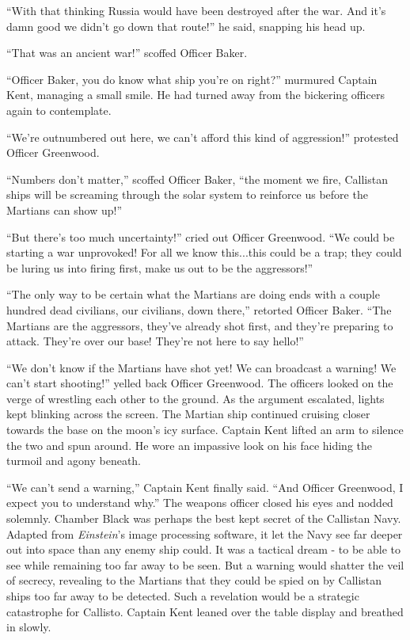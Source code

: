\documentclass[12pt]{article} %
\begin{document}
``With that thinking Russia would have been destroyed after the war. And it's damn good we didn't go down that route!'' he said, snapping his head up.

``That was an ancient war!'' scoffed Officer Baker.

``Officer Baker, you do know what ship you're on right?'' murmured Captain Kent, managing a small smile. He had turned away from the bickering officers again to contemplate.

``We're outnumbered out here, we can't afford this kind of aggression!'' protested Officer Greenwood.

``Numbers don't matter,'' scoffed Officer Baker, ``the moment we fire, Callistan ships will be screaming through the solar system to reinforce us before the Martians can show up!''

``But there's too much uncertainty!'' cried out Officer Greenwood. ``We could be starting a war unprovoked! For all we know this...this could be a trap; they could be luring us into firing first, make us out to be the aggressors!''

``The only way to be certain what the Martians are doing ends with a couple hundred dead civilians, our civilians, down there,'' retorted Officer Baker. ``The Martians are the aggressors, they've already shot first, and they're preparing to attack. They're over our base! They're not here to say hello!''

``We don't know if the Martians have shot yet! We can broadcast a warning! We can't start shooting!'' yelled back Officer Greenwood. The officers looked on the verge of wrestling each other to the ground. As the argument escalated, lights kept blinking across the screen. The Martian ship continued cruising closer towards the base on the moon's icy surface. Captain Kent lifted an arm to silence the two and spun around. He wore an impassive look on his face hiding the turmoil and agony beneath.

``We can't send a warning,'' Captain Kent finally said. ``And Officer Greenwood, I expect you to understand why.'' The weapons officer closed his eyes and nodded solemnly. Chamber Black was perhaps the best kept secret of the Callistan Navy. Adapted from \textit{Einstein}'s image processing software, it let the Navy see far deeper out into space than any enemy ship could. It was a tactical dream - to be able to see while remaining too far away to be seen. But a warning would shatter the veil of secrecy, revealing to the Martians that they could be spied on by Callistan ships too far away to be detected. Such a revelation would be a strategic catastrophe for Callisto. Captain Kent leaned over the table display and breathed in slowly.
\end{document}
